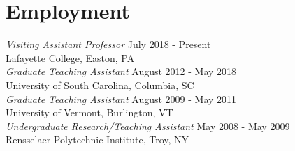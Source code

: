 \documentclass{article}
\begin{document}
  \section*{Employment}

  \textsl{Visiting Assistant Professor} \hfill July 2018 - Present\\
  Lafayette College, Easton, PA\\
  
  \noindent \textsl{Graduate Teaching Assistant} \hfill August 2012 - May 2018 \\
  University of South Carolina, Columbia, SC\\
  
  \noindent\textsl{Graduate Teaching Assistant} \hfill August 2009 - May 2011 \\
  University of Vermont, Burlington, VT\\

  \noindent\textsl{Undergraduate Research/Teaching Assistant} \hfill May 2008 - May 2009 \\
  Rensselaer Polytechnic Institute, Troy, NY\\
\end{document}
